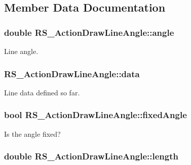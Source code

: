 \subsection{Member Data Documentation}
\hypertarget{classRS__ActionDrawLineAngle_a52b9926296010039d78a056e4c3408cc}{
\subsubsection[{angle}]{\setlength{\rightskip}{0pt plus 5cm}double R\-S\-\_\-\-Action\-Draw\-Line\-Angle\-::angle\hspace{0.3cm}{\ttfamily [protected]}}}\label{classRS__ActionDrawLineAngle_a52b9926296010039d78a056e4c3408cc}
Line angle. \hypertarget{classRS__ActionDrawLineAngle_a3b25308dde7f93c13e5a1a5b19219440}{
\subsubsection[{data}]{ R\-S\-\_\-\-Action\-Draw\-Line\-Angle\-::data\hspace{0.3cm}{\ttfamily [protected]}}}\label{classRS__ActionDrawLineAngle_a3b25308dde7f93c13e5a1a5b19219440}
Line data defined so far. \hypertarget{classRS__ActionDrawLineAngle_a55aac1522eca70558ac4136f06dc3a82}{
\subsubsection[{fixed\-Angle}]{\setlength{\rightskip}{0pt plus 5cm}bool R\-S\-\_\-\-Action\-Draw\-Line\-Angle\-::fixed\-Angle\hspace{0.3cm}{\ttfamily [protected]}}}\label{classRS__ActionDrawLineAngle_a55aac1522eca70558ac4136f06dc3a82}
Is the angle fixed? \hypertarget{classRS__ActionDrawLineAngle_a35c40febb8773592c14b649bd666769e}{
\subsubsection[{length}]{\setlength{\rightskip}{0pt plus 5cm}double R\-S\-\_\-\-Action\-Draw\-Line\-Angle\-::length\hspace{0.3cm}{\ttfamily [protected]}}}\label{classRS__ActionDrawLineAngle_a35c40febb8773592c14b649bd666769e}
